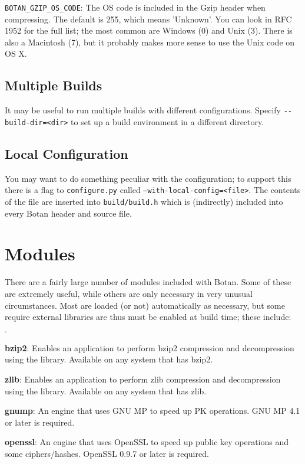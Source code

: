 \documentclass{article}
\newcommand{\filename}[1]{\texttt{#1}}
\newcommand{\macro}[1]{\texttt{#1}}
\begin{document}
\macro{BOTAN\_GZIP\_OS\_CODE}: The OS code is included in the Gzip header when
compressing. The default is 255, which means 'Unknown'. You can look in RFC
1952 for the full list; the most common are Windows (0) and Unix (3). There is
also a Macintosh (7), but it probably makes more sense to use the Unix code on
OS X.

\subsection{Multiple Builds}

It may be useful to run multiple builds with different
configurations. Specify \verb|--build-dir=<dir>| to set up a build
environment in a different directory.

\subsection{Local Configuration}

You may want to do something peculiar with the configuration; to
support this there is a flag to \filename{configure.py} called
\texttt{--with-local-config=<file>}. The contents of the file are
inserted into \filename{build/build.h} which is (indirectly) included
into every Botan header and source file.

\section{Modules}

There are a fairly large number of modules included with Botan. Some
of these are extremely useful, while others are only necessary in very
unusual circumstances. Most are loaded (or not) automatically as
necessary, but some require external libraries are thus must be
enabled at build time; these include:

\newcommand{\mod}[2]{\textbf{#1}: #2}

\begin{list}{$\cdot$}
  \item \mod{bzip2}{Enables an application to perform bzip2 compression
         and decompression using the library. Available on any system that has
         bzip2.}

  \item \mod{zlib}{Enables an application to perform zlib compression and
         decompression using the library. Available on any system that has
         zlib.}

  \item \mod{gnump}{An engine that uses GNU MP to speed up PK operations.
         GNU MP 4.1 or later is required.}

  \item \mod{openssl}{An engine that uses OpenSSL to speed up public key
                      operations and some ciphers/hashes. OpenSSL 0.9.7 or
                      later is required.}
\end{list}
\end{document}
